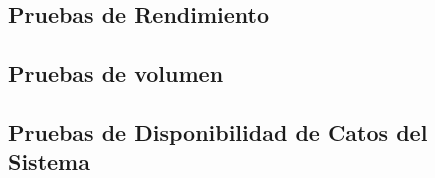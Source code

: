 {\subsection{Pruebas de Rendimiento}




\subsection{Pruebas de volumen}



\newpage
\subsection{Pruebas de Disponibilidad de Catos del Sistema}



\newpage

}